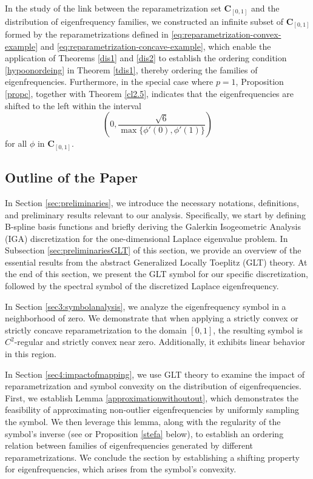 \documentclass[11pt]{article}
\begin{document}
In the study of the link between the reparametrization set \( \mathbf{C}_{[0,1]} \) and the distribution of eigenfrequency families, we constructed an infinite subset of \( \mathbf{C}_{[0,1]} \) formed by the reparametrizations defined in \eqref{eq:reparametrization-convex-example} and \eqref{eq:reparametrization-concave-example},  which enable the application of Theorems \ref{dis1} and \ref{dis2} to establish the ordering condition \eqref{hypoonordeing} in Theorem \ref{tdis1},  thereby ordering the families of eigenfrequencies. Furthermore, in the  special case where \( p=1 \), Proposition \ref{propc}, together with Theorem \ref{cl2.5}, indicates that the eigenfrequencies are shifted to the left within the interval  
\[
\left(0,\frac{\sqrt{6}}{\max\{\phi'(0),\phi'(1)\}}\right)
\]
for all \( \phi \) in \( \mathbf{C}_{[0,1]} \).  





\subsection{Outline of the Paper}   

In Section \ref{sec:preliminaries}, we introduce the necessary notations, definitions, and preliminary results relevant to our analysis. Specifically, we start by defining  B-spline basis functions and briefly deriving the Galerkin Isogeometric Analysis (IGA) discretization for the one-dimensional Laplace eigenvalue  
problem. In  Subsection \ref{sec:preliminariesGLT} of this section, we provide an overview of the essential results from the abstract Generalized Locally Toeplitz (GLT) theory. At the end of this section, we present the GLT symbol for our specific discretization,  followed by the spectral symbol of the discretized Laplace eigenfrequency.  

In Section \ref{sec3:symbolanalysis}, we analyze the eigenfrequency symbol in a neighborhood of zero. We demonstrate that when applying a strictly convex or strictly concave reparametrization to the domain \( [0,1] \), the resulting symbol is \( C^2 \)-regular and strictly convex near zero. Additionally, it exhibits  linear behavior in this region.  

In Section \ref{sec4:impactofmapping}, we use GLT theory to examine the impact of reparametrization and symbol convexity on the distribution of eigenfrequencies. First, we establish Lemma \ref{approximationwithoutout}, which demonstrates the feasibility of approximating non-outlier eigenfrequencies by uniformly sampling the symbol. We then leverage this lemma, along with the regularity of the symbol’s inverse (see \cite{bianchi2018spectral} or Proposition \ref{stefa} below), to establish an ordering relation between families of eigenfrequencies generated by different reparametrizations. We conclude the section by establishing a shifting property for eigenfrequencies, which arises from the symbol's convexity.  
\end{document}
